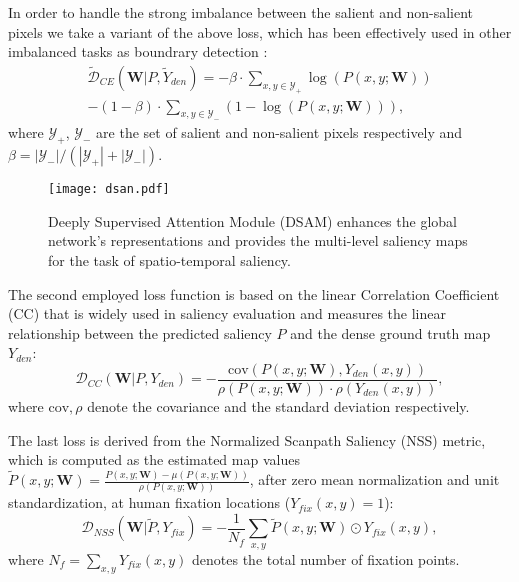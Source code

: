 \documentclass[10pt,twocolumn,letterpaper]{article}
\begin{document}
In order to handle the strong imbalance between the salient and non-salient pixels we take a variant of the above loss, which has been effectively used in other imbalanced tasks as boundrary detection \cite{xie2015holistically,kokkinos2015pushing,maninis2016convolutional}: 
\begin{equation}
\begin{split}
\tilde{\mathcal{D}}_{CE}(\mathbf{W}|P,\tilde{Y}_{den})= - \beta \cdot \sum_{x,y \in \mathcal{Y}_+} \log(P(x,y;\mathbf{W})) \\
- (1-\beta) \cdot \sum_{x,y \in \mathcal{Y}_-} (1-\log(P(x,y;\mathbf{W}))),  
\end{split}
\end{equation}
where $\mathcal{Y}_+$, $\mathcal{Y}_-$ are the set of salient and non-salient pixels respectively and $\beta=|\mathcal{Y}_-|/(|\mathcal{Y}_+| + |\mathcal{Y}_-|)$.
\begin{figure}[t]
\begin{center}
\texttt{[image: dsan.pdf]}
\end{center}
\caption{Deeply Supervised Attention Module (DSAM) enhances the global network's representations and provides the multi-level saliency maps for the task of spatio-temporal saliency.}
\label{fig:dsam}
\end{figure}
The second employed loss function is based on the linear Correlation Coefficient (CC) that is widely used in saliency evaluation and measures the linear relationship between the predicted saliency $P$ and the dense ground truth map $Y_{den}$:
\begin{equation}
\mathcal{D}_{CC}(\mathbf{W}|P,Y_{den}) = -\frac{\mathrm{cov}(P(x,y;\mathbf{W}),Y_{den}(x,y))}{\rho(P(x,y;\mathbf{W}))\cdot\rho(Y_{den}(x,y))}, 
\end{equation} 
where $\mathrm{cov},\rho$ denote the covariance and the standard deviation respectively. 

The last loss is derived from the Normalized Scanpath Saliency (NSS) metric, which is computed
as the estimated map values $\tilde{P}(x,y;\mathbf{W})=\frac{P(x,y;\mathbf{W})-\mu(P(x,y;\mathbf{W}))}{\rho(P(x,y;\mathbf{W}))}$, after zero mean normalization and unit standardization, at human fixation locations ($Y_{fix}(x,y)=1$):
\begin{equation}
\mathcal{D}_{NSS}(\mathbf{W}|\tilde{P},Y_{fix}) = - \frac{1}{N_{f}} \sum_{x,y} \tilde{P}(x,y;\mathbf{W})\odot Y_{fix}(x,y),
\end{equation}
where $N_{f}=\sum_{x,y}Y_{fix}(x,y)$ denotes the total number of fixation points. 
\end{document}
